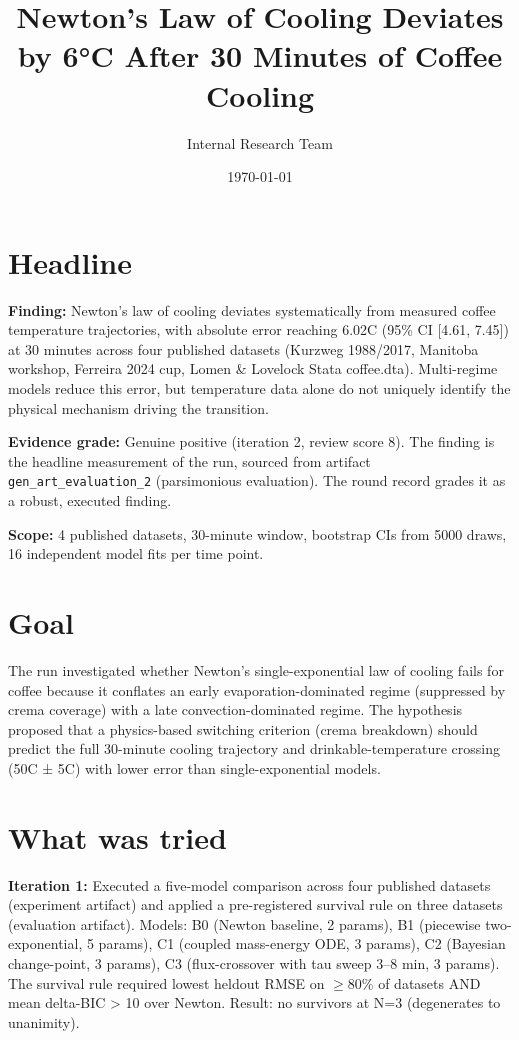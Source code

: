 \documentclass{article}
\title{Newton's Law of Cooling Deviates by 6°C After 30 Minutes of Coffee Cooling}
\author{Internal Research Team}
\date{\today}
\begin{document}
\maketitle

\section{Headline}
\textbf{Finding:} Newton's law of cooling deviates systematically from measured coffee temperature trajectories, with absolute error reaching 6.02\textdegree C (95\% CI [4.61, 7.45]) at 30 minutes across four published datasets (Kurzweg 1988/2017, Manitoba workshop, Ferreira 2024 cup, Lomen \& Lovelock Stata coffee.dta). Multi-regime models reduce this error, but temperature data alone do not uniquely identify the physical mechanism driving the transition.

\textbf{Evidence grade:} Genuine positive (iteration 2, review score 8). The finding is the headline measurement of the run, sourced from artifact \\
\texttt{gen\_art\_evaluation\_2} (parsimonious evaluation). The round record grades it as a robust, executed finding.

\textbf{Scope:} 4 published datasets, 30-minute window, bootstrap CIs from 5000 draws, 16 independent model fits per time point.

\section{Goal}
The run investigated whether Newton's single-exponential law of cooling fails for coffee because it conflates an early evaporation-dominated regime (suppressed by crema coverage) with a late convection-dominated regime. The hypothesis proposed that a physics-based switching criterion (crema breakdown) should predict the full 30-minute cooling trajectory and drinkable-temperature crossing (50\textdegree C ± 5\textdegree C) with lower error than single-exponential models.

\section{What was tried}
\textbf{Iteration 1:} Executed a five-model comparison across four published datasets (experiment artifact) and applied a pre-registered survival rule on three datasets (evaluation artifact). Models: B0 (Newton baseline, 2 params), B1 (piecewise two-exponential, 5 params), C1 (coupled mass-energy ODE, 3 params), C2 (Bayesian change-point, 3 params), C3 (flux-crossover with tau sweep 3--8 min, 3 params). The survival rule required lowest heldout RMSE on $\geq$80\% of datasets AND mean delta-BIC > 10 over Newton. Result: no survivors at N=3 (degenerates to unanimity).
\end{document}
